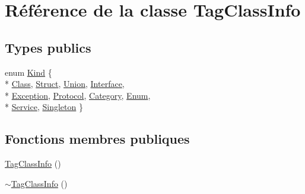 \hypertarget{class_tag_class_info}{}\section{Référence de la classe Tag\+Class\+Info}
\label{class_tag_class_info}
\subsection*{Types publics}
\begin{DoxyCompactItemize}
\item 
enum \hyperlink{class_tag_class_info_accc1e7a47f78728ae2d5da7b06a1244e}{Kind} \{ \\*
\hyperlink{class_tag_class_info_accc1e7a47f78728ae2d5da7b06a1244ea692d98814080bce7c062e87e6c6a0300}{Class}, 
\hyperlink{class_tag_class_info_accc1e7a47f78728ae2d5da7b06a1244ea59bfc0810295428999716a8bf144a208}{Struct}, 
\hyperlink{class_tag_class_info_accc1e7a47f78728ae2d5da7b06a1244eac8d90445d7a2fb0c7a675ce503788bb8}{Union}, 
\hyperlink{class_tag_class_info_accc1e7a47f78728ae2d5da7b06a1244ea65c7eb1c0f851cd8080446e25dc617ba}{Interface}, 
\\*
\hyperlink{class_tag_class_info_accc1e7a47f78728ae2d5da7b06a1244ea86caade126b24cf11ec8c71a097b5fba}{Exception}, 
\hyperlink{class_tag_class_info_accc1e7a47f78728ae2d5da7b06a1244eaba52decdcd84b41aa2922d11aac6dc68}{Protocol}, 
\hyperlink{class_tag_class_info_accc1e7a47f78728ae2d5da7b06a1244ea81b6f5991f9fcf8f252e4408271dad6f}{Category}, 
\hyperlink{class_tag_class_info_accc1e7a47f78728ae2d5da7b06a1244eaea010b94c4ff8253f69c22c19b590a13}{Enum}, 
\\*
\hyperlink{class_tag_class_info_accc1e7a47f78728ae2d5da7b06a1244ead220512bf9d3b5329670fedbc04296f1}{Service}, 
\hyperlink{class_tag_class_info_accc1e7a47f78728ae2d5da7b06a1244eaa7d6edfe4d3318db58cd14aaf3c005e0}{Singleton}
 \}
\end{DoxyCompactItemize}
\subsection*{Fonctions membres publiques}
\begin{DoxyCompactItemize}
\item 
\hyperlink{class_tag_class_info_a1d270b82494f024ee1c0ff13a78937db}{Tag\+Class\+Info} ()
\item 
\hyperlink{class_tag_class_info_aae7fec5485b21ba6f67dc393f02dbc7e}{$\sim$\+Tag\+Class\+Info} ()
\end{DoxyCompactItemize}
